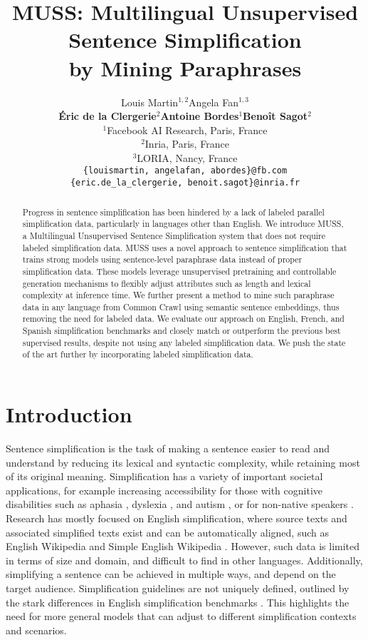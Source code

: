 \documentclass[11pt]{article}
\title{MUSS: Multilingual Unsupervised Sentence Simplification\\ by Mining Paraphrases}
\author{Louis Martin$^{1,2}$\quad Angela Fan$^{1,3}$\\ \large\textbf{\'Eric de la Clergerie$^2$\quad Antoine Bordes$^1$\quad Beno\^it Sagot$^2$}\\
  $^{1}$Facebook AI Research, Paris, France \\
  $^{2}$Inria, Paris, France \\
  $^{3}$LORIA, Nancy, France\\
  \texttt{\{louismartin, angelafan, abordes\}@fb.com}\\
  \texttt{\{eric.de\_la\_clergerie, benoit.sagot\}@inria.fr}}
\newcommand{\muss}{\textsc{MUSS}\xspace}
\begin{document}
\maketitle
\begin{abstract}
Progress in sentence simplification has been hindered by a lack of labeled  parallel simplification data, particularly in languages other than English.
We introduce \muss, a Multilingual Unsupervised Sentence Simplification system that does not require labeled simplification data.
\muss uses a novel approach to sentence simplification that trains strong models using sentence-level paraphrase data  instead of proper simplification data.
These models leverage unsupervised pretraining and controllable generation mechanisms to flexibly adjust attributes such as length and lexical complexity at inference time.
We further present a method to mine such paraphrase data in any language from Common Crawl using semantic sentence embeddings, thus removing the need for labeled data.
We evaluate our approach on English, French, and Spanish simplification benchmarks and closely match or outperform the previous best supervised results, despite not using any labeled simplification data.
We push the state of the art further by incorporating labeled simplification data.
\end{abstract} \section{Introduction}

Sentence simplification is the task of making a sentence easier to read and understand by reducing its lexical and syntactic complexity, while retaining most of its original meaning. Simplification has a variety of important societal applications, for example increasing accessibility for those with cognitive disabilities such as aphasia \cite{carroll1998practical}, dyslexia \cite{rello2013simplify}, and autism \cite{evans2014evaluation}, or for non-native speakers \cite{paetzold2016unsupervised}. Research has mostly focused on English simplification, where source texts and  associated simplified texts exist and can be automatically aligned, such as English Wikipedia and Simple English Wikipedia \cite{zhang2017sentence}. However, such data is limited in terms of size and domain, and difficult to find in other languages.
Additionally, simplifying a sentence can be achieved in multiple ways, and depend on the target audience. Simplification guidelines are not uniquely defined, outlined by the stark differences in English simplification benchmarks \cite{alva2020asset}.
This highlights the need for more general models that can adjust to different simplification contexts and scenarios.
\end{document}
